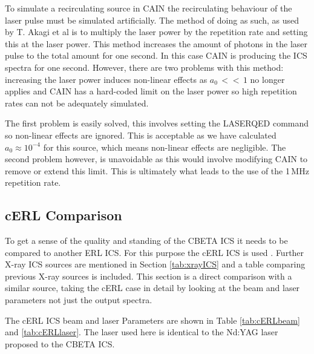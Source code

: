 \documentclass[11pt]{article}
\begin{document}
To simulate a recirculating source in CAIN the recirculating behaviour of the laser pulse must be simulated artificially. The method of doing as such, as used by T. Akagi et al \cite{TAkagicERL} is to multiply the laser power by the repetition rate and setting this at the laser power. This method increases the amount of photons in the laser pulse to the total amount for one second. In this case CAIN is producing the ICS spectra for one second. However, there are two problems with this method: increasing the laser power induces non-linear effects as $a_{0}\,<<\,1$ no longer applies and CAIN has a hard-coded limit on the laser power so high repetition rates can not be adequately simulated.

The first problem is easily solved, this involves setting the LASERQED command so non-linear effects are ignored. This is acceptable as we have calculated $a_{0} \approx 10^{-4}$ for this source, which means non-linear effects are negligible. The second problem however, is unavoidable as this would involve modifying CAIN to remove or extend this limit. This is ultimately what leads to the use of the 1\,MHz repetition rate. 


\subsection{cERL Comparison}
\label{sec:cERLcomp}

To get a sense of the quality and standing of the CBETA ICS it needs to be compared to another ERL ICS. For this purpose the cERL ICS is used \cite{TAkagicERL}. Further X-ray ICS sources are mentioned in Section \ref{tab:xrayICS} and a table comparing previous X-ray sources is included. This section is a direct comparison with a similar source, taking the cERL case in detail by looking at the beam and laser parameters not just the output spectra.

The cERL ICS beam and laser Parameters are shown in Table \ref{tab:cERLbeam} and \ref{tab:cERLlaser}. The laser used here is identical to the Nd:YAG laser proposed to the CBETA ICS.
\end{document}
